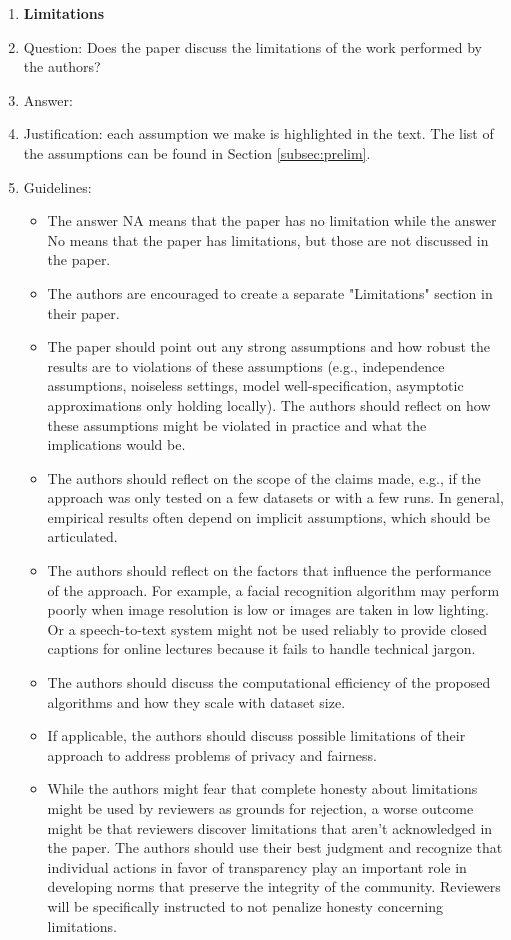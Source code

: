 \documentclass{article}
\theoremstyle{plain}
\theoremstyle{definition}
\theoremstyle{remark}
\begin{document}
\begin{enumerate}
\item {\bf Limitations}
    \item[] Question: Does the paper discuss the limitations of the work performed by the authors?
    \item[] Answer: \answerYes{} %
    \item[] Justification: each assumption we make is highlighted in the text. The list of the assumptions can be found in Section \ref{subsec:prelim}.
    \item[] Guidelines:
    \begin{itemize}
        \item The answer NA means that the paper has no limitation while the answer No means that the paper has limitations, but those are not discussed in the paper. 
        \item The authors are encouraged to create a separate "Limitations" section in their paper.
        \item The paper should point out any strong assumptions and how robust the results are to violations of these assumptions (e.g., independence assumptions, noiseless settings, model well-specification, asymptotic approximations only holding locally). The authors should reflect on how these assumptions might be violated in practice and what the implications would be.
        \item The authors should reflect on the scope of the claims made, e.g., if the approach was only tested on a few datasets or with a few runs. In general, empirical results often depend on implicit assumptions, which should be articulated.
        \item The authors should reflect on the factors that influence the performance of the approach. For example, a facial recognition algorithm may perform poorly when image resolution is low or images are taken in low lighting. Or a speech-to-text system might not be used reliably to provide closed captions for online lectures because it fails to handle technical jargon.
        \item The authors should discuss the computational efficiency of the proposed algorithms and how they scale with dataset size.
        \item If applicable, the authors should discuss possible limitations of their approach to address problems of privacy and fairness.
        \item While the authors might fear that complete honesty about limitations might be used by reviewers as grounds for rejection, a worse outcome might be that reviewers discover limitations that aren't acknowledged in the paper. The authors should use their best judgment and recognize that individual actions in favor of transparency play an important role in developing norms that preserve the integrity of the community. Reviewers will be specifically instructed to not penalize honesty concerning limitations.
    \end{itemize}


\end{enumerate}
\end{document}

